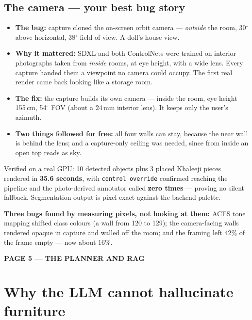 \documentclass[10.5pt,a4paper]{article}
\newcommand{\pagelabel}[2]{%
  {\sffamily\bfseries\scriptsize\color{brass}\MakeUppercase{Page #1 --- #2}}\par\vspace{0.2em}}
\begin{document}
\subsection*{The camera --- your best bug story}
\begin{itemize}[leftmargin=1.1em,itemsep=1pt]
  \item \textbf{The bug:} capture cloned the on-screen orbit camera --- \emph{outside} the room,
        30$^\circ$ above horizontal, 38$^\circ$ field of view. A doll's-house view.
  \item \textbf{Why it mattered:} SDXL and both ControlNets were trained on interior photographs
        taken from \emph{inside} rooms, at eye height, with a wide lens. Every capture handed them a
        viewpoint no camera could occupy. The first real render came back looking like a storage room.
  \item \textbf{The fix:} the capture builds its own camera --- inside the room, eye height 155\,cm,
        54$^\circ$ FOV (about a 24\,mm interior lens). It keeps only the user's azimuth.
  \item \textbf{Two things followed for free:} all four walls can stay, because the near wall is
        behind the lens; and a capture-only ceiling was needed, since from inside an open top reads
        as sky.
\end{itemize}

\begin{strength}
Verified on a real GPU: 10 detected objects plus 3 placed Khaleeji pieces rendered in
\textbf{35.6 seconds}, with \texttt{control\_override} confirmed reaching the pipeline and the
photo-derived annotator called \textbf{zero times} --- proving no silent fallback. Segmentation
output is pixel-exact against the backend palette.
\end{strength}

\textbf{Three bugs found by measuring pixels, not looking at them:} ACES tone mapping shifted class
colours (a wall from 120 to 129); the camera-facing walls rendered opaque in capture and walled off
the room; and the framing left 42\% of the frame empty --- now about 16\%.

\newpage
\pagelabel{5}{the planner and rag}
\section*{Why the LLM cannot hallucinate furniture}
\end{document}
